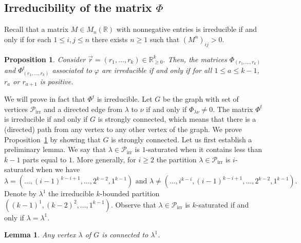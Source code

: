 \documentclass[10pt,a4paper]{amsart}
\newtheorem{lemma}[theorem]{Lemma}
\newtheorem{prop}[theorem]{Proposition}
\theoremstyle{definition}
\DeclareMathOperator{\irr}{irr}
\begin{document}
\subsection{Irreducibility of the matrix \texorpdfstring{$\Phi$}{Phi}}

Recall that a matrix $M\in M_{n}(\mathbb{R})$ with nonnegative entries is
irreducible if and only if for each $1\leq i,j\leq n$ there exists $n\geq1$
such that $(M^{n})_{ij}>0$.

\begin{prop}
\label{irredPhi}Consider $\vec{r}=(r_{1},\ldots,r_{k})\in\mathbb{R}_{\geq
0}^{k}.$ Then, the matrices $\Phi_{(r_{1},\ldots,r_{k})}$ and $\Phi
_{(r_{1},\ldots,r_{k})}^{t}$ associated to $\varphi$ are irreducible if and
only if for all $1\leq a\leq k-1$, $r_{a}$ or $r_{a+1}$ is positive.
\end{prop}

We will prove in fact that $\Phi^{t}$ is irreducible. Let $G$ be the graph
with set of vertices $\mathcal{P}_{\irr }$ and a directed edge from
$\lambda$ to $\nu$ if and only if $\Phi_{\lambda\nu}\not =0$. The matrix
$\Phi^{t}$ is irreducible if and only if $G$ is strongly connected, which
means that there is a (directed) path from any vertex to any other vertex of
the graph. We prove Proposition~\ref{irredPhi} by showing that $G$ is strongly
connected. Let us first establish a preliminary lemma. We say that $\lambda
\in\mathcal{P}_{\irr }$ is $1$-saturated when it contains less than
$k-1$ parts equal to $1$. More generally, for $i\geq2$ the partition
$\lambda\in\mathcal{P}_{\irr }$ is $i$-saturated when we have%
\[
\lambda=(\ldots,(i-1)^{k-i+1},\dots,2^{k-2},1^{k-1})\text{ and }\lambda
\neq(\ldots,i^{k-i},(i-1)^{k-i+1},\dots,2^{k-2},1^{k-1}).
\]
Denote by $\lambda^{1}$ the irreducible $k$-bounded partition $((k-1)^{1}%
,(k-2)^{2},\dots,1^{k-1})$. Observe that $\lambda\in\mathcal{P}_{\irr %
}$ is $k$-saturated if and only if $\lambda=\lambda^{1}$.

\begin{lemma}
Any vertex $\lambda$ of $G$ is connected to $\lambda^{1}$.
\end{lemma}
\end{document}
